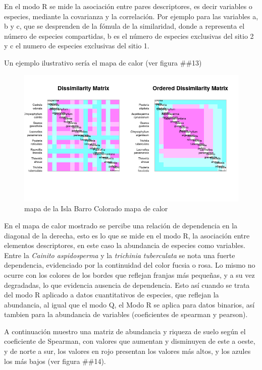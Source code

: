 \documentclass[11pt,]{article}
\begin{document}
En el modo R se mide la asociación entre pares descriptores, es decir
variables o especies, mediante la covarianza y la correlación. Por
ejemplo para las variables a, b y c, que se desprenden de la fómula de
la similaridad, donde a representa el número de especies compartidas, b
es el número de especies exclusivas del sitio 2 y c el numero de
especies exclusivas del sitio 1.

Un ejemplo ilustrativo sería el mapa de calor (ver figura \#\#13)

\begin{figure}
\centering
\includegraphics[width=1.00000\textwidth]{mapadecalor.png}
\caption{mapa de la Isla Barro Colorado mapa de calor
\label{fig:bci_map}}
\end{figure}

En el mapa de calor mostrado se percibe una relación de dependencia en
la diagonal de la derecha, esto es lo que se mide en el modo R, la
asociación entre elementos descriptores, en este caso la abundancia de
especies como variables. Entre la \emph{Cainito aspidosperma} y la
\emph{trichinia tuberculata} se nota una fuerte dependencia, evidenciado
por la continuidad del color fucsia o rosa. Lo mismo no ocurre con los
colores de los bordes que reflejan franjas más pequeñas, y a su vez
degradadas, lo que evidencia ausencia de dependencia. Esto así cuando se
trata del modo R aplicado a datos cuantitativos de especies, que
reflejan la abundancia, al igual que el modo Q, el Modo R se aplica para
datos binarios, así tambien para la abundancia de variables
(coeficientes de spearman y pearson).

A continuación muestro una matriz de abundancia y riqueza de suelo según
el coeficiente de Spearman, con valores que aumentan y disminuyen de
este a oeste, y de norte a sur, los valores en rojo presentan los
valores más altos, y los azules los más bajos (ver figura \#\#14).
\end{document}
